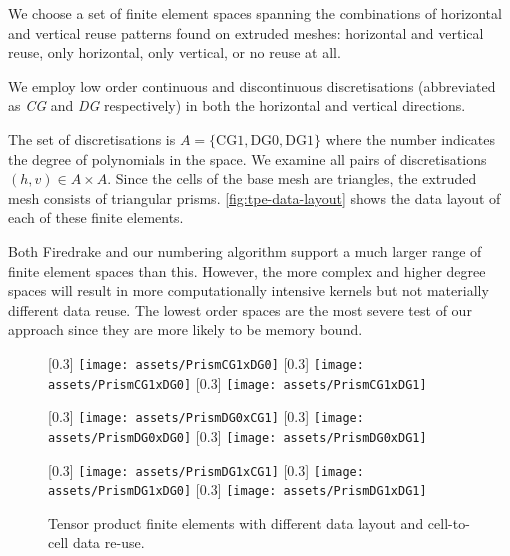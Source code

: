 \documentclass[11pt, a4paper]{scrartcl}
\begin{document}
We choose a set of finite element spaces spanning the combinations of
horizontal and vertical reuse patterns found on extruded meshes:
horizontal and vertical reuse, only horizontal, only vertical, or no
reuse at all.

We employ low order continuous and discontinuous discretisations
(abbreviated as \emph{CG} and \emph{DG} respectively) in both the
horizontal and vertical directions.

The set of discretisations is
$A = \{\mathrm{CG1}, \mathrm{DG0}, \mathrm{DG1}\}$ where the number
indicates the degree of polynomials in the space. We examine all pairs
of discretisations $ (h , v) \in A \times A$. Since the cells of the
base mesh are triangles, the extruded mesh consists of triangular
prisms. \autoref{fig:tpe-data-layout} shows the data layout of each of
these finite elements.

Both Firedrake and our numbering algorithm support a much larger range
of finite element spaces than this. However, the more complex and
higher degree spaces will result in more computationally intensive
kernels but not materially different data reuse. The lowest order
spaces are the most severe test of our approach since they are more
likely to be memory bound.

\begin{figure}
  \centering
  [0.3\linewidth]
  {\texttt{[image: assets/PrismCG1xDG0]}}
  [0.3\linewidth]
  {\texttt{[image: assets/PrismCG1xDG0]}}
  [0.3\linewidth]
  {\texttt{[image: assets/PrismCG1xDG1]}}

  \vspace{1em}
  [0.3\linewidth]
  {\texttt{[image: assets/PrismDG0xCG1]}}
  [0.3\linewidth]
  {\texttt{[image: assets/PrismDG0xDG0]}}
  [0.3\linewidth]
  {\texttt{[image: assets/PrismDG0xDG1]}}

  \vspace{1em}
  [0.3\linewidth]
  {\texttt{[image: assets/PrismDG1xCG1]}}
  [0.3\linewidth]
  {\texttt{[image: assets/PrismDG1xDG0]}}
  [0.3\linewidth]
  {\texttt{[image: assets/PrismDG1xDG1]}}
  \caption{Tensor product finite elements with different data layout
    and cell-to-cell data re-use.}
\label{fig:tpe-data-layout}
\end{figure}
\end{document}
